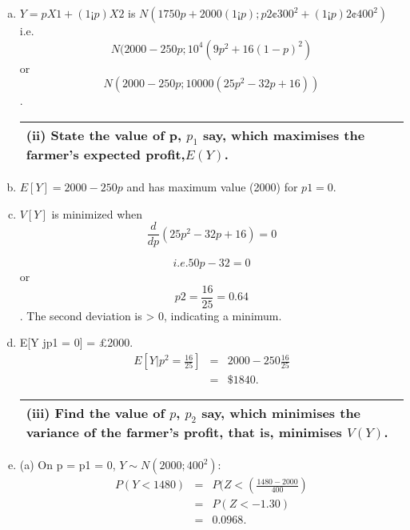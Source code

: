 \documentclass[a4paper,12pt]{article}
\begin{document}
\begin{enumerate}[(a)]
\item $Y = pX1 + (1 ¡ p)X2$ is $N(1750p + 2000(1 ¡ p); p2 ¢ 300^2 + (1 ¡ p)2 ¢ 400^2)$
i.e. \[N(2000 - 250p; 10^4(9p^2 + 16(1 - p)^2)\]
or \[N(2000 - 250p; 10000(25p^2 - 32p + 16))\].


\newpage
  \begin{table}[ht!]
     \centering
     \begin{tabular}{|p{15cm}|}
     \hline  
(ii) State the value of p, $p_1$ say, which maximises the farmer’s expected profit,$E(Y)$. 
\\ \hline 
      \end{tabular}
    \end{table}
    
    
\item $E[Y ] = 2000 - 250p$ and has maximum value (2000) for $p1 = 0$.
\item $V[Y]$ is minimized when 
\[ \frac{d}{dp}(25p^2 - 32p + 16) =0\]

\[i.e. 50p - 32 = 0\] or \[p2 = \frac{16}{25}=0.64\].
The second deviation is > 0, indicating a minimum.
\item  E[Y jp1 = 0] = £2000. 
\begin{eqnarray*}
E\left[Y | p^2 = \frac{16}{25}\right] &=& 2000 - 250 \frac{16}{25}\\ 
&=& \$1840.
\end{eqnarray*}


\newpage
  \begin{table}[ht!]
     \centering
     \begin{tabular}{|p{15cm}|}
     \hline  

(iii) Find the value of $p$, $p_2$  say, which minimises the variance of the farmer’s profit, that is, minimises $V(Y)$. \\ \hline 
      \end{tabular}
    \end{table}
\item  (a) On p = p1 = 0, $Y \sim N(2000; 400^2)$:
\begin{eqnarray*}
P(Y < 1480) &=& P(Z < \left( \frac{1480-2000}{400}
\right) \\
&=& P(Z < -1.30)\\ 
&=& 0.0968.\\
\end{eqnarray*}


\end{enumerate}
\end{document}
